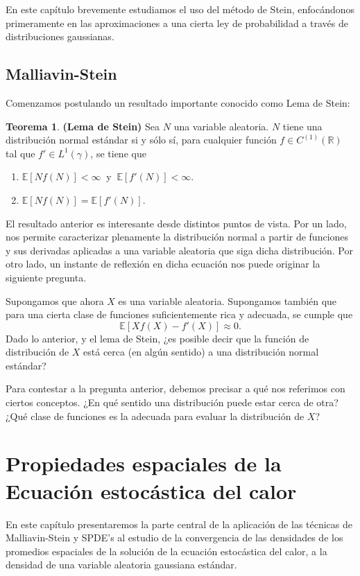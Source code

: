 \documentclass[letterpaper,twoside,12pt]{book}
\newcommand{\R}{\mathbb{R}}
\newcommand{\E}{\mathbb{E}}
\newcommand{\1}{\mathds{1}}
\theoremstyle{definition}
\theoremstyle{definition}
\newtheorem{teo}{Teorema}
\theoremstyle{definition}
\theoremstyle{definition}
\theoremstyle{definition}
\theoremstyle{definition}
\theoremstyle{definition}
\begin{document}
En este capítulo brevemente estudiamos el uso del método de Stein, enfocándonos primeramente en las aproximaciones a una cierta ley de probabilidad a través de distribuciones gaussianas.
\section{Malliavin-Stein}
Comenzamos postulando un resultado importante conocido como Lema de Stein:
\begin{teo}\textbf{(Lema de Stein)} Sea $N$ una variable aleatoria. $N$ tiene una distribución normal estándar si y sólo sí, para cualquier función $f\in C^{(1)}(\R)$ tal que $f'\in L^{1}(\gamma)$, se tiene que
    \begin{enumerate}
        \item $\E\left[Nf(N)\right]<\infty \ $ y $ \ \E\left[f'(N)\right]<\infty$.
        \item $\E\left[Nf(N)\right]=\E\left[f'(N)\right]$.
    \end{enumerate}
 \end{teo}
El resultado anterior es interesante desde distintos puntos de vista. Por un lado, nos permite caracterizar plenamente la distribución normal a partir de funciones y sus derivadas aplicadas a una variable aleatoria que siga dicha distribución. Por otro lado, un instante de reflexión en dicha ecuación nos puede originar la siguiente pregunta.

Supongamos que ahora $X$ es una variable aleatoria. Supongamos también que para una cierta clase de funciones suficientemente rica y adecuada, se cumple que 
\[
\E\left[Xf(X)-f'(X)\right]\approx0.    
\]
Dado lo anterior, y el lema de Stein, ¿es posible decir que la función de distribución de $X$ está cerca (en algún sentido) a una distribución normal estándar?

Para contestar a la pregunta anterior, debemos precisar a qué nos referimos con ciertos conceptos. ¿En qué sentido una distribución puede estar cerca de otra? ¿Qué clase de funciones es la adecuada para evaluar la distribución de $X$? 

\chapter{Propiedades espaciales de la Ecuación estocástica del calor}
En este capítulo presentaremos la parte central de la aplicación de las técnicas de Malliavin-Stein y SPDE's al estudio de la convergencia de las densidades de los promedios espaciales de la solución de la ecuación estocástica del calor, a la densidad de una variable aleatoria gaussiana estándar.
\end{document}
